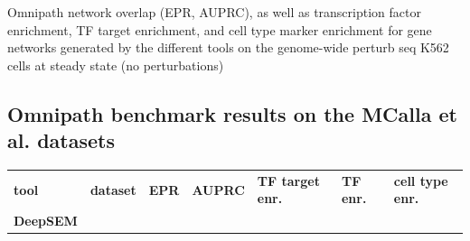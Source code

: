 Omnipath network overlap (EPR, AUPRC), as well as transcription factor
enrichment, TF target enrichment, and cell type marker enrichment for
gene networks generated by the different tools on the genome-wide
perturb seq K562 cells at steady state (no perturbations)

\subsection{Omnipath benchmark results on the MCalla et al.
datasets}\label{table-s9-omnipath-benchmark-results-on-the-mcalla-et-al.-datasets}

\begin{longtable}[H]{@{}
  >{\raggedright\arraybackslash}p{}
  >{\raggedright\arraybackslash}p{}
  >{\raggedright\arraybackslash}p{}
  >{\raggedright\arraybackslash}p{}
  >{\raggedright\arraybackslash}p{}
  >{\raggedright\arraybackslash}p{}
  >{\raggedright\arraybackslash}p{}@{}}
\toprule\noalign{}
\begin{minipage}[b]{\linewidth}\centering
\textbf{tool}
\end{minipage} & \begin{minipage}[b]{\linewidth}\centering
\textbf{dataset}
\end{minipage} & \begin{minipage}[b]{\linewidth}\centering
\textbf{EPR}
\end{minipage} & \begin{minipage}[b]{\linewidth}\centering
\textbf{AUPRC}
\end{minipage} & \begin{minipage}[b]{\linewidth}\centering
\textbf{TF target enr.}
\end{minipage} & \begin{minipage}[b]{\linewidth}\centering
\textbf{TF enr.}
\end{minipage} & \begin{minipage}[b]{\linewidth}\centering
\textbf{cell type enr.}
\end{minipage} \\
\begin{minipage}[b]{\linewidth}\centering
\textbf{DeepSEM}
\end{minipage} & \begin{minipage}[b]{\linewidth}\centering

\end{minipage}
\end{longtable}
